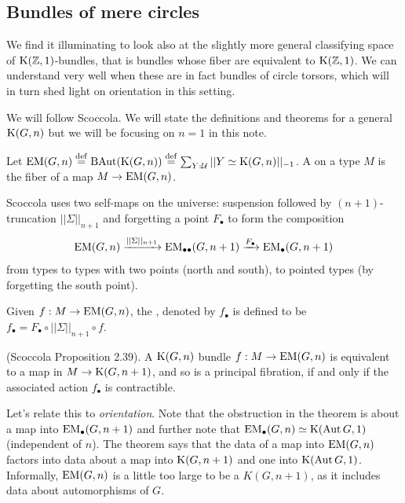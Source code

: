 \subsection{Bundles of mere circles}

We find it illuminating to look also at the slightly more general classifying space of \( \mathrm{K}(\mathbb{Z},1) \)-bundles, that is bundles whose fiber are equivalent to \( \mathrm{K}(\mathbb{Z},1) \). We can understand very well when these are in fact bundles of circle torsors, which will in turn shed light on orientation in this setting. 

We will follow Scoccola\cite{sco}. We will state the definitions and theorems for a general \( \mathrm{K}(G,n) \) but we will be focusing on \( n=1 \) in this note.

\begin{mydef}
Let \( \mathrm{EM}(G,n)\stackrel{\mathrm{def}}{=} \operatorname{BAut}(\mathrm{K}(G,n))\stackrel{\mathrm{def}}{=} \sum_{Y:\mathcal{U}}||Y\simeq \mathrm{K}(G,n)||_{-1}\). A  on a type \( M \) is the fiber of a map \( M\to\mathrm{EM}(G,n) \).
\end{mydef}

Scoccola uses two self-maps on the universe: suspension followed by \( (n+1) \)-truncation \( ||\Sigma||_{n+1} \) and forgetting a point \( F_\bullet \) to form the composition 
\[ 
\mathrm{EM}(G,n)\xrightarrow[]{||\Sigma||_{n+1}} \mathrm{EM}_{\bullet\bullet}(G,n+1)\xrightarrow[]{F_\bullet}\mathrm{EM_{\bullet}}(G,n+1)
\]
from types to types with two points (north and south), to pointed types (by forgetting the south point).

\begin{mydef}
Given \( f:M\to\mathrm{EM}(G,n) \), the , denoted by \( f_\bullet \) is defined to be \( f_\bullet=F_\bullet\circ||\Sigma||_{n+1}\circ f \).
\end{mydef}

\begin{mythm}
(Scoccola\cite{sco} Proposition 2.39). A \( \mathrm{K}(G,n) \) bundle \( f:M\to\mathrm{EM}(G,n) \) is equivalent to a map in \( M\to\mathrm{K}(G,n+1) \), and so is a principal fibration, if and only if the associated action \( f_\bullet \) is contractible.
\end{mythm}

Let's relate this to \emph{orientation}. Note that the obstruction in the theorem is about a map into \( \mathrm{EM_{\bullet}}(G,n+1) \) and further note that \( \mathrm{EM_{\bullet}}(G,n)\simeq \mathrm{K}(\operatorname{Aut} G,1) \) (independent of \( n \)). The theorem says that the data of a map into \( \mathrm{EM}(G,n) \) factors into data about a map into \( \mathrm{K}(G,n+1) \) and one into \( \mathrm{K}(\operatorname{Aut} G,1) \). Informally, \( \mathrm{EM}(G,n) \) is a little too large to be a \( K(G,n+1) \), as it includes data about automorphisms of \( G \).

